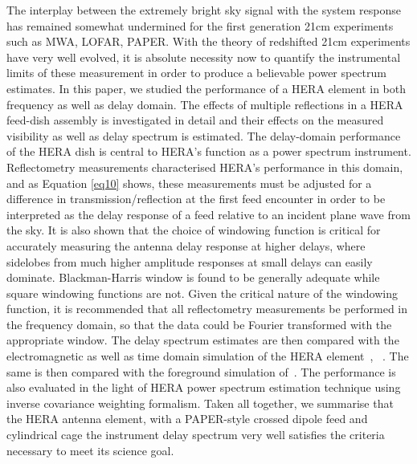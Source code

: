 \documentclass[twocolumn]{emulateapj}
\begin{document}
The interplay between the extremely bright sky signal with the system response
has remained somewhat undermined for the first generation 21cm experiments such
as MWA, LOFAR, PAPER. With the theory of redshifted 21cm experiments have very
well evolved, it is absolute necessity now to quantify the instrumental limits
of these measurement in order to produce a believable power spectrum estimates.
In this paper, we studied the performance of a HERA element in both frequency
as well as delay domain. The effects of multiple reflections  in a HERA
feed-dish assembly is investigated in detail and their effects on the measured
visibility as well as delay spectrum is estimated.  The delay-domain
performance of the HERA dish is central to HERA's function as a power spectrum
instrument. Reflectometry measurements characterised HERA's performance in this
domain, and as Equation \ref{eq10} shows, these measurements must be adjusted
for a difference in transmission/reflection at the first feed encounter in
order to be interpreted as the delay response of a feed relative to an incident
plane wave from the sky.  It is also shown that the choice of windowing
function is critical for accurately measuring the antenna delay response at
higher delays, where sidelobes from much higher amplitude responses at small
delays can easily dominate.  Blackman-Harris window is found to be generally
adequate while square windowing functions are not.  Given the critical nature
of the windowing function, it is recommended that all reflectometry
measurements be performed in the frequency domain, so that the data could be
Fourier transformed with the appropriate window.  The delay spectrum estimates
are then compared with the electromagnetic as well as time domain simulation of
the HERA element~\citep{Ewall-Wice_et_al2016}, ~\citep{ddboer_et_al2016}. The
same is then compared with the foreground simulation
of~\cite{Thyagarajan_et_al2015}. The performance is also evaluated in the light
of HERA power spectrum estimation technique using inverse covariance weighting
formalism.  Taken all together, we summarise that the HERA antenna element,
with a PAPER-style crossed dipole feed and cylindrical cage the instrument
delay spectrum very well satisfies the criteria necessary to meet its science
goal. 


{}
\end{document}
